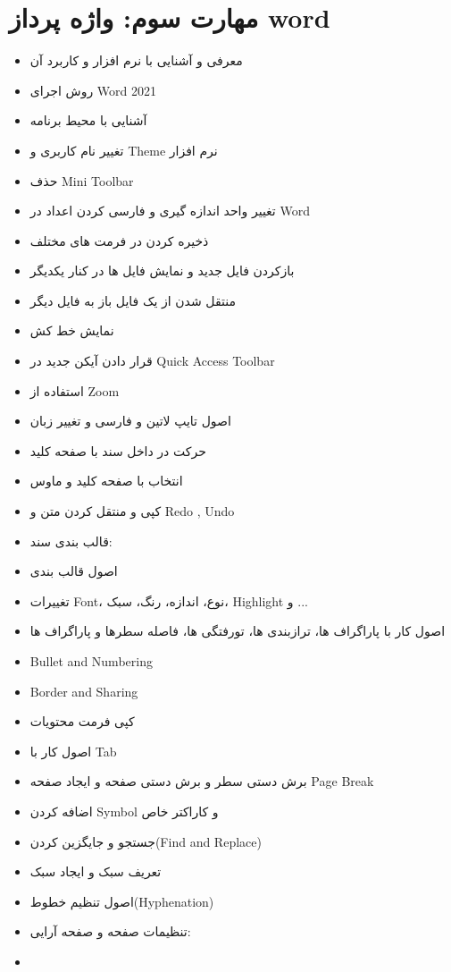 \section{مهارت سوم: واژه پرداز word}
\begin{itemize}
\item
معرفی و آشنایی با نرم افزار و کاربرد آن
\item
روش اجرای Word 2021
\item
آشنایی با محیط برنامه
\item
تغییر نام کاربری و Theme نرم افزار
\item
حذف Mini Toolbar
\item
تغییر واحد اندازه گیری و فارسی کردن اعداد در Word
\item
ذخیره کردن در فرمت های مختلف
\item
بازکردن فایل جدید و نمایش فایل ها در کنار یکدیگر
\item
منتقل شدن از یک فایل باز به فایل دیگر
\item
نمایش خط کش
\item
قرار دادن آیکن جدید در Quick Access Toolbar
\item
استفاده از Zoom
\item
اصول تایپ لاتین و فارسی و تغییر زبان
\item
حرکت در داخل سند با صفحه کلید
\item
انتخاب با صفحه کلید و ماوس
\item
کپی و منتقل کردن متن و Redo , Undo
\item
قالب بندی سند:
\item
اصول قالب بندی
\item
تغییرات Font، نوع، اندازه، رنگ، سبک، Highlight و ...
\item
اصول کار با پاراگراف ها، ترازبندی ها، تورفتگی ها، فاصله
سطرها و پاراگراف ها
\item
Bullet and Numbering
\item
Border and Sharing
\item
کپی فرمت محتویات
\item
اصول کار با Tab
\item
برش دستی سطر و برش دستی صفحه و ایجاد صفحه Page Break
\item
اضافه کردن Symbol و کاراکتر خاص
\item
جستجو و جایگزین کردن(Find and Replace)
\item
تعریف سبک و ایجاد سبک
\item
اصول تنظیم خطوط(Hyphenation)
\item
تنظیمات صفحه و صفحه آرایی:
\item

\end{itemize}
